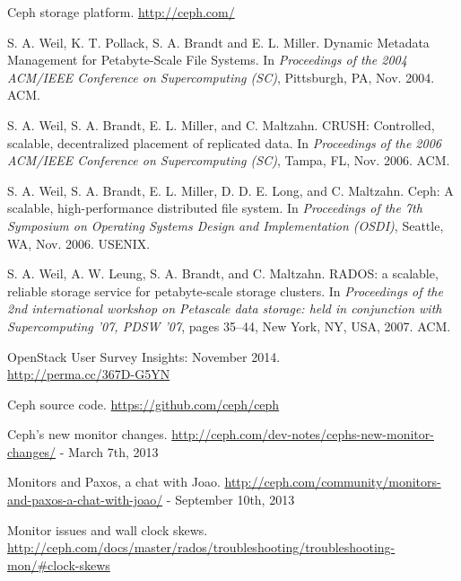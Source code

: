 \documentclass{article}
\begin{document}
\clearpage

\begin{thebibliography}{1}

   Ceph storage platform. \url{http://ceph.com/} 
  
   S. A. Weil, K. T. Pollack, S. A. Brandt and E. L. Miller. Dynamic Metadata Management for Petabyte-Scale File Systems.
  In \textit{Proceedings of the 2004 ACM/IEEE Conference on Supercomputing (SC)}, Pittsburgh, PA, Nov. 2004. ACM.

   S. A. Weil, S. A. Brandt, E. L. Miller, and C. Maltzahn. CRUSH: Controlled, scalable, decentralized placement of replicated data. 
  In \textit{Proceedings of the 2006 ACM/IEEE Conference on Supercomputing (SC)}, Tampa, FL, Nov. 2006. ACM.

   S. A. Weil, S. A. Brandt, E. L. Miller, D. D. E. Long, and C. Maltzahn. Ceph: A scalable, high-performance distributed file system. 
  In \textit{Proceedings of the 7th Symposium on Operating Systems Design and Implementation (OSDI)}, Seattle, WA, Nov. 2006. USENIX.
	
   S. A. Weil, A. W. Leung, S. A. Brandt, and C. Maltzahn. RADOS: a scalable, reliable storage service for petabyte-scale storage clusters. 
  In \textit{Proceedings of the 2nd international workshop on Petascale data storage: held in conjunction with Supercomputing ’07, PDSW ’07},  pages 35–44, New York, NY, USA, 2007. ACM.

   OpenStack User Survey Insights: November 2014. \\
  \url{http://perma.cc/367D-G5YN} 
  
   Ceph source code. \url{https://github.com/ceph/ceph} 
  
   Ceph's new monitor changes. \url{http://ceph.com/dev-notes/cephs-new-monitor-changes/} - March 7th, 2013
  
   Monitors and Paxos, a chat with Joao. 
    \url{http://ceph.com/community/monitors-and-paxos-a-chat-with-joao/} - September 10th, 2013
  
   Monitor issues and wall clock skews. 
  \url{http://ceph.com/docs/master/rados/troubleshooting/troubleshooting-mon/#clock-skews}


\end{thebibliography}
	
\end{document}
